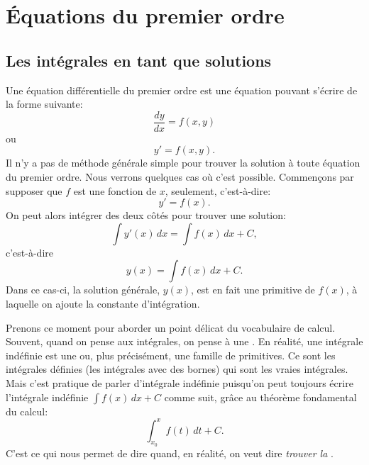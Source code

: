 \chapter{Équations du premier ordre} \label{fo:chapter}


\section{Les intégrales en tant que solutions}
\label{integralsols:section}


Une équation différentielle du premier ordre est une équation pouvant s'écrire de la forme suivante:
\begin{equation*}
	\frac{dy}{dx} = f(x,y)
\end{equation*}
ou
\begin{equation*}
	y' = f(x,y) .
\end{equation*}
Il n'y a pas de méthode générale simple pour trouver la solution  à toute équation du premier ordre.
Nous verrons quelques cas où c'est possible.
Commençons par supposer que $f$ est une fonction de $x$, seulement, c'est-à-dire:
\begin{equation} \label{ias:inteq}
	y' = f(x) .
\end{equation}
On peut alors intégrer des deux côtés pour trouver une solution:
\begin{equation*}
	\int y'(x) \,dx = \int f(x) \,dx + C ,
\end{equation*}
c'est-à-dire
\begin{equation*}
	y(x) = \int f(x) \,dx + C .
\end{equation*}
Dans ce cas-ci, la solution générale, $y(x)$, est en fait une primitive de $f(x)$,
à laquelle on ajoute la constante d'intégration.

\medskip

Prenons ce moment pour aborder un point délicat du vocabulaire de calcul.
Souvent, quand on pense aux intégrales, on pense à une .
En réalité, une intégrale indéfinie est une \emph{} ou, plus précisément, une famille de primitives.
Ce sont les intégrales définies (les intégrales avec des bornes) qui sont les vraies intégrales.
Mais c'est pratique de parler d'intégrale \og{}indéfinie\fg{} puisqu'on peut toujours écrire l'intégrale indéfinie
$\int f(x) \,dx + C$ comme suit, grâce au théorème fondamental du calcul:
\begin{equation*}
	\int_{x_0}^x f(t) \,dt + C .
\end{equation*}
C'est ce qui nous permet de dire  \emph{ } quand, en réalité,
on veut dire  \emph{trouver la }.

